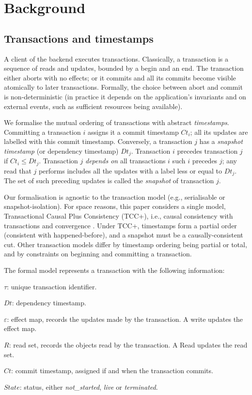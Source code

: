 \documentclass[systeme,french,english]{compas2022}
\begin{document}
\section{Background}


\subsection{Transactions and timestamps}
\label{sec:transactions}


A client of the backend executes transactions.
Classically, a transaction is a sequence of reads and updates, bounded by
a begin and an end.
The transaction either aborts with no effects; or it commits and all its
commits become visible atomically to later transactions.
Formally, the choice between abort and commit is non-deterministic (in
practice it depends on the application's invariants and on external
events, such as sufficient resources being available).

We formalise the mutual ordering of transactions with abstract
\emph{timestamps}.
Committing a transaction $i$ assigns it a commit timestamp
$\mathit{Ct}_{i}$; all its updates are labelled with this commit
timestamp.
Conversely, a transaction $j$  has a \emph{snapshot timestamp} (or dependency
timestamp) $\mathit{Dt}_{j}$.
Transaction $i$ precedes transaction $j$ if $\mathit{Ct}_{i} \le
\mathit{Dt}_{j}$.
Transaction $j$ \emph{depends on} all transactions $i$ such $i$ precedes
$j$; any read that $j$ performs includes all the updates with a label
less or equal to $\mathit{Dt}_{j}$.
The set of such preceding updates is called the \emph{snapshot} of
transaction $j$.
 
Our formalisation is agnostic to the transaction model (e.g.,
serialisable or snapshot-isolation).
For space reasons, this paper considers a single model, Transactional
Causal Plus Consistency (TCC+), i.e., causal consistency with
transactions and convergence \cite{rep:syn:sh228,rep:pro:sh182}.
Under TCC+, timestamps form a partial order (consistent with
happened-before), and a snapshot must be a causally-consistent cut.
Other transaction models differ by timestamp ordering being partial or
total, and by constraints on beginning and committing a transaction.

The formal model represents a transaction with the following information:
\begin{compactitem}
\item $\tau$: unique transaction identifier.
\item $\mathit{Dt}$: dependency timestamp.
\item {$\varepsilon$}: effect map, records the updates made by the
  transaction.
  A write updates the effect map.
\item ${R}$: read set, records the objects read by the transaction.
  A Read updates the read set.
\item $\mathit{Ct}$: commit timestamp, assigned if and when the
  transaction commits.
\item $\mathit{State}$: status, either \emph{not\_started}, \emph{live} or \emph{terminated}.\\
\end{compactitem}
\end{document}

